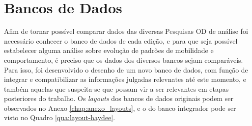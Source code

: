 \section{Bancos de Dados}\label{sec:bd}

Afim de tornar possível comparar dados das diversas Pesquisas OD de análise foi necessário conhecer o banco de dados de cada edição, e para que seja possível estabelecer alguma análise sobre evolução de padrões de mobilidade e comportamento, é preciso que os dados dos diversos bancos sejam comparáveis. Para isso, foi desenvolvido o desenho de um novo banco de dados, com função de integrar e compatibilizar as informações julgadas relevnates até este momento, e também aquelas que suspeita-se que possam vir a ser relevantes em etapas posteriores do trabalho. Os \emph{layouts} dos bancos de dados originais podem ser observados no Anexo \ref{chap:anexo_layouts}, e o do  banco integrador pode ser visto no Quadro \ref{qua:layout-haydee}.

